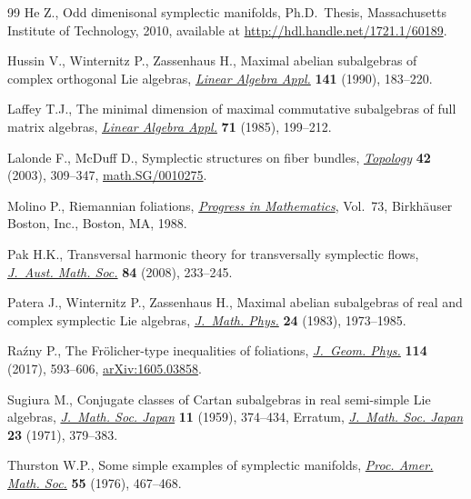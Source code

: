 \documentclass[pdftex]{sigma}
\numberwithin{equation}{section}
\begin{document}
\begin{thebibliography}{99}
He Z., Odd dimenisonal symplectic manifolds, Ph.D.~Thesis, Massachusetts
 Institute of Technology, 2010, available at \url{http://hdl.handle.net/1721.1/60189}.

Hussin V., Winternitz P., Zassenhaus H., Maximal abelian subalgebras of complex
 orthogonal {L}ie algebras, \href{https://doi.org/10.1016/0024-3795(90)90317-6}{\textit{Linear Algebra Appl.}} \textbf{141} (1990),
 183--220.

Laffey T.J., The minimal dimension of maximal commutative subalgebras of full
 matrix algebras, \href{https://doi.org/10.1016/0024-3795(85)90247-2}{\textit{Linear Algebra Appl.}} \textbf{71} (1985), 199--212.

Lalonde F., McDuff D., Symplectic structures on fiber bundles,
 \href{https://doi.org/10.1016/S0040-9383(01)00020-9}{\textit{Topology}} \textbf{42} (2003), 309--347, \href{https://arxiv.org/abs/math.SG/0010275}{math.SG/0010275}.

Molino P., Riemannian foliations, \href{https://doi.org/10.1007/978-1-4684-8670-4}{\textit{Progress in Mathematics}}, Vol.~73,
 Birkh\"auser Boston, Inc., Boston, MA, 1988.

Pak H.K., Transversal harmonic theory for transversally symplectic flows,
 \href{https://doi.org/10.1017/S1446788708000190}{\textit{J.~Aust. Math. Soc.}} \textbf{84} (2008), 233--245.

Patera J., Winternitz P., Zassenhaus H., Maximal abelian subalgebras of
 real and complex symplectic {L}ie algebras, \href{https://doi.org/10.1063/1.525955}{\textit{J.~Math. Phys.}}
 \textbf{24} (1983), 1973--1985.

Ra\'zny P., The {F}r\"olicher-type inequalities of foliations, \href{https://doi.org/10.1016/j.geomphys.2017.01.005}{\textit{J.~Geom.
 Phys.}} \textbf{114} (2017), 593--606, \href{https://arxiv.org/abs/1605.03858}{arXiv:1605.03858}.

Sugiura M., Conjugate classes of {C}artan subalgebras in real semi-simple {L}ie
 algebras, \href{https://doi.org/10.2969/jmsj/01140374}{\textit{J.~Math. Soc. Japan}} \textbf{11} (1959), 374--434,
 {E}rratum, \href{https://doi.org/10.2969/jmsj/02320379}{\textit{J.~Math. Soc.
 Japan}} {\bf 23} (1971), 379--383.

Thurston W.P., Some simple examples of symplectic manifolds, \href{https://doi.org/10.2307/2041749}{\textit{Proc.
 Amer. Math. Soc.}} \textbf{55} (1976), 467--468.


\end{thebibliography}
\end{document}
